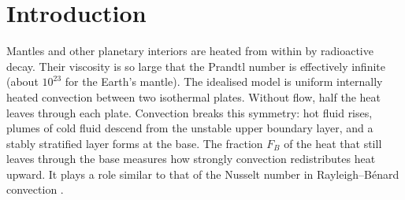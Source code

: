 \section{Introduction}\label{sec:intro}

Mantles and other planetary interiors are heated from within by radioactive decay. Their viscosity is so
large that the Prandtl number is effectively infinite (about $10^{23}$ for the Earth's mantle). The idealised
model is uniform internally heated convection between two isothermal plates. Without flow, half the heat
leaves through each plate. Convection breaks this symmetry: hot fluid rises, plumes of cold fluid descend from
the unstable upper boundary layer, and a stably stratified layer forms at the base. The fraction $F_B$ of the
heat that still leaves through the base measures how strongly convection redistributes heat upward. It plays a
role similar to that of the Nusselt number in Rayleigh--B\'enard convection \citep{Goluskin2016}.

